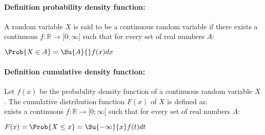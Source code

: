 \paragraph{Definition probability density function:}
A random variable $X$ is said to be a continuous random variable if there
exists a continuous $f:\mathbb{R}\rightarrow [0;\infty[$ such that for 
every set of real numbers $A$:
\begin{center}
	$\Prob{X\in A}=\Su{A}{{}}f(x)dx$
\end{center}
\paragraph{Definition cumulative density function:}
Let $f(x)$ be the probability density function of a continuous random
variable $X$. The cumulative distribution function $F(x)$ of $X$ is defined
as:\\
exists a continuous $f:\mathbb{R}\rightarrow [0;\infty[$ such that for 
every set of real numbers $A$:
\begin{center}
	$F(x)=\Prob{X\leq x}=\Su{-\infty}{x}f(t)dt$
\end{center}
